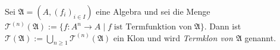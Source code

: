 \begin{definition}
    Sei $\mathfrak{A} = (A, (f_i)_{i \in I})$ eine Algebra und sei die Menge $\mathcal{T}^{(n)}(\mathfrak{A}) := \{f: A^n \to A\mid f\;\text{ist Termfunktion von}\;\mathfrak{A}\}$. Dann ist $\mathcal{T}(\mathfrak{A}) := \bigcup_{n \ge 1} \mathcal{T}^{(n)}(\mathfrak{A})$ ein Klon und wird \emph{Termklon von $\mathfrak{A}$} genannt.
\end{definition}